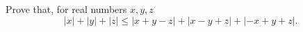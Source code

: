 Prove that, for real numbers $x, y, z$
\[ |x| + |y| + |z| \leq |x + y - z| + |x - y + z| + |-x + y + z|. \]
